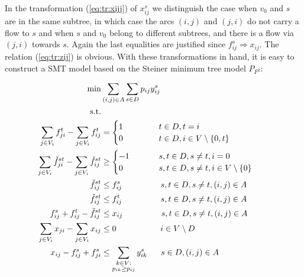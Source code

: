 In the transformation (\ref{eq:tr:xijj}) of $x_{ij}^s$ we distinguish the case when $v_0$ and $s$ are in the same subtree, in which case the arcs $(i,j)$ and $(j,i)$ do not carry a flow to $s$ and when $s$ and $v_0$ belong to different subtrees, and there is a flow via $(j,i)$ towards $s$. Again the last equalities are justified since $f_{ij}^s\Rightarrow x_{ij}$. The relation (\ref{eq:tr:zij}) is obvious.
With these transformations in hand, it is easy to construct a SMT model based on the Steiner minimum tree model $P_{F^2}$:

    \begin{subequations}
    \begin{flalign}
  \min &  \sum\limits_{(i,j) \in A} \sum\limits_{s \in D} p_{ij} y^s_{ij}    \\  \notag  
		   \text{s.t.}&                  && \\	\ 
 \label{con:pf2:flow}  \sum\limits_{\substack{ j \in V_i }}f^{t}_{ji}-\sum\limits_{\substack{j\in V_i}}f^{t}_{ij}    & = \begin{cases}
    1~~~~&  t\in D, t = i \\        0~~~~ \qquad             & t\in D, i\in V\setminus \{0, t\}\end{cases}     \\	
\label{con:pf2:flowSource}  \sum\limits_{\substack{ j \in V_i }}\check{f}^{st}_{ji}-\sum\limits_{\substack{j\in V_i}}\check{f}^{st}_{ij}    & \geq \begin{cases}
    -1~~~&  s,t\in D,s\neq t, i = 0 \\        0  ~~~~   \qquad         & s,t\in D,s\neq t, i\in V\setminus \{0\}\end{cases}     \\			
\label{con:pf2:startInSource}  \check{f}^{st}_{ij}    & \leq f^s_{ij}~~   \qquad  \qquad s,t\in D,s\neq t, (i,j)\in A \\	
\label{con:pf2:stopInDest}  \check{f}^{st}_{ij}    & \leq f^t_{ij}~~   \qquad    \qquad s,t\in D,s\neq t, (i,j)\in A \\			 		
 \label{con:pf2:stronger}  f^{s}_{ij}+f^{t}_{ij}-\check{f}^{st}_{ij}    &\leq x_{ij}    ~~ \qquad \qquad  s,t\in D,s\neq t, (i,j)\in A \\			 
		 	 \label{con:pf2:flowX}  \sum\limits_{\substack{ j\in V_i }}x_{ji}-\sum\limits_{\substack{j\in V_i}}x_{ij}    & \leq 0~~~~    \qquad\qquad			  i\in V\setminus D \\			 			   	
		  \label{con:pf2:yvar} x_{ij} -f^s_{ij}+f^s_{ji}  &\leq \sum\limits_{\substack{k\in V: \\ p_{ik}\geq p_{ij}}}y^s_{ik}   ~~\quad  s\in D, (i,j)\in A \\  		

\end{flalign}
\end{subequations}
